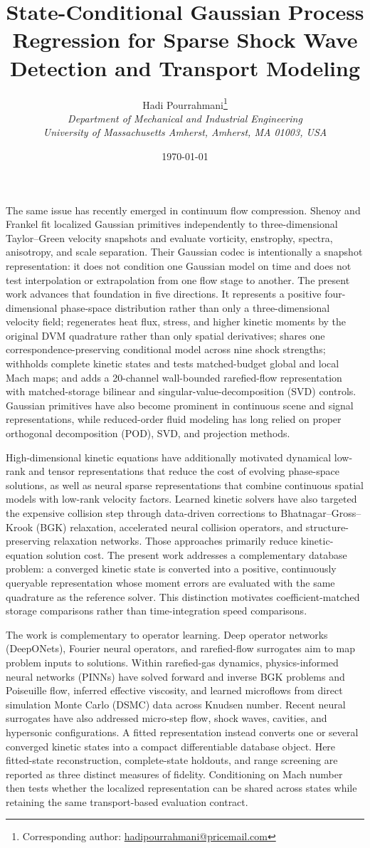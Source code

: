 \documentclass[11pt,a4paper]{article}
\title{State-Conditional Gaussian Process Regression for Sparse Shock Wave Detection and Transport Modeling}
\author{Hadi Pourrahmani\thanks{Corresponding author: \href{mailto:hadipourrahmani@pricemail.com}{hadipourrahmani@pricemail.com}}\\
\textit{Department of Mechanical and Industrial Engineering}\\
\textit{University of Massachusetts Amherst, Amherst, MA 01003, USA}}
\date{\today}
\begin{document}
The same issue has recently emerged in continuum flow compression. Shenoy and Frankel  fit localized Gaussian primitives independently to three-dimensional Taylor--Green velocity snapshots and evaluate vorticity, enstrophy, spectra, anisotropy, and scale separation. Their Gaussian codec is intentionally a snapshot representation: it does not condition one Gaussian model on time and does not test interpolation or extrapolation from one flow stage to another. The present work advances that foundation in five directions. It represents a positive four-dimensional phase-space distribution rather than only a three-dimensional velocity field; regenerates heat flux, stress, and higher kinetic moments by the original DVM quadrature rather than only spatial derivatives; shares one correspondence-preserving conditional model across nine shock strengths; withholds complete kinetic states and tests matched-budget global and local Mach maps; and adds a 20-channel wall-bounded rarefied-flow representation with matched-storage bilinear and singular-value-decomposition (SVD) controls. Gaussian primitives have also become prominent in continuous scene and signal representations, while reduced-order fluid modeling has long relied on proper orthogonal decomposition (POD), SVD, and projection methods.

High-dimensional kinetic equations have additionally motivated dynamical low-rank and tensor representations that reduce the cost of evolving phase-space solutions, as well as neural sparse representations that combine continuous spatial models with low-rank velocity factors. Learned kinetic solvers have also targeted the expensive collision step through data-driven corrections to Bhatnagar--Gross--Krook (BGK) relaxation, accelerated neural collision operators, and structure-preserving relaxation networks. Those approaches primarily reduce kinetic-equation solution cost. The present work addresses a complementary database problem: a converged kinetic state is converted into a positive, continuously queryable representation whose moment errors are evaluated with the same quadrature as the reference solver. This distinction motivates coefficient-matched storage comparisons rather than time-integration speed comparisons.

The work is complementary to operator learning. Deep operator networks (DeepONets), Fourier neural operators, and rarefied-flow surrogates aim to map problem inputs to solutions. Within rarefied-gas dynamics, physics-informed neural networks (PINNs) have solved forward and inverse BGK problems and Poiseuille flow, inferred effective viscosity, and learned microflows from direct simulation Monte Carlo (DSMC) data across Knudsen number. Recent neural surrogates have also addressed micro-step flow, shock waves, cavities, and hypersonic configurations. A fitted representation instead converts one or several converged kinetic states into a compact differentiable database object. Here fitted-state reconstruction, complete-state holdouts, and range screening are reported as three distinct measures of fidelity. Conditioning on Mach number then tests whether the localized representation can be shared across states while retaining the same transport-based evaluation contract.
\end{document}
